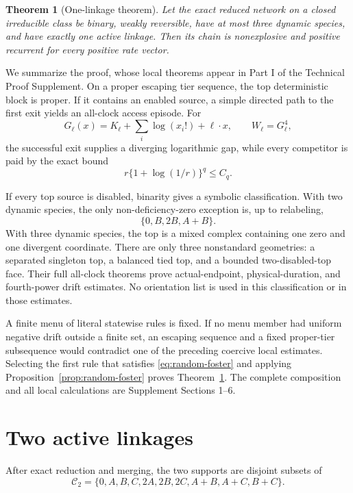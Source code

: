 \documentclass[11pt]{article}
\newtheorem{theorem}{Theorem}[section]
\theoremstyle{definition}
\theoremstyle{remark}
\newcommand{\cC}{\mathcal C}
\newcommand{\1}{\mathbf 1}
\begin{document}
\begin{theorem}[One-linkage theorem]\label{thm:one-link}
Let the exact reduced network on a closed irreducible class be binary, weakly
reversible, have at most three dynamic species, and have exactly one active
linkage.  Then its chain is nonexplosive and positive recurrent for every
positive rate vector.
\end{theorem}

We summarize the proof, whose local theorems appear in Part I of the Technical
Proof Supplement.  On a proper escaping tier sequence, the top deterministic
block is proper.  If it contains an enabled source, a simple directed path to
the first exit yields an all-clock access episode.  For
\[
 G_\ell(x)=K_\ell+\sum_i\log(x_i!)+\ell\cdot x,
 \qquad W_\ell=G_\ell^4,
\]
the successful exit supplies a diverging logarithmic gap, while every
competitor is paid by the exact bound
\[
                  r\{1+\log(1/r)\}^q\le C_q.
\]

If every top source is disabled, binarity gives a symbolic classification.
With two dynamic species, the only non-deficiency-zero exception is, up to
relabeling,
\[
                   \{0,B,2B,A+B\}.
\]
With three dynamic species, the top is a mixed complex containing one zero
and one divergent coordinate.  There are only three nonstandard geometries:
a separated singleton top, a balanced tied top, and a bounded two-disabled-top
face.  Their full all-clock theorems prove actual-endpoint, physical-duration,
and fourth-power drift estimates.  No orientation list is used in this
classification or in those estimates.

A finite menu of literal statewise rules is fixed.  If no menu member had
uniform negative drift outside a finite set, an escaping sequence and a fixed
proper-tier subsequence would contradict one of the preceding coercive local
estimates.  Selecting the first rule that satisfies
\eqref{eq:random-foster} and applying Proposition~\ref{prop:random-foster}
proves Theorem~\ref{thm:one-link}.  The complete composition and all local
calculations are Supplement Sections 1--6.

\section{Two active linkages}

After exact reduction and merging, the two supports are disjoint subsets of
\begin{equation}\label{eq:binary-complexes}
 \cC_2=\{0,A,B,C,2A,2B,2C,A+B,A+C,B+C\}.
\end{equation}
\end{document}

